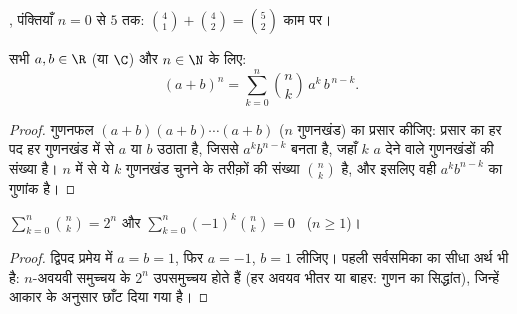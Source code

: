 \begin{omfigure}

{\small {}, पंक्तियाँ $n = 0$ से $5$ तक:  $\binom{4}{1} + \binom{4}{2} = \binom{5}{2}$ काम
पर।}
\end{omfigure}

\begin{theorem}[द्विपद प्रमेय]\label{thm:g12:comb:binomial}
सभी $a, b \in \R$ (या $\C$) और $n \in \N$ के लिए:
\[
(a+b)^n = \sum_{k=0}^{n} \binom{n}{k}\, a^{k}\, b^{\,n-k} .
\]
\end{theorem}

\begin{proof}
गुणनफल $(a+b)(a+b)\cdots(a+b)$ ($n$ गुणनखंड) का प्रसार कीजिए: प्रसार का हर पद हर गुणनखंड में
से $a$ या $b$ उठाता है, जिससे $a^k b^{n-k}$ बनता है, जहाँ $k$ $a$ देने वाले
गुणनखंडों की संख्या है। $n$ में से ये $k$ गुणनखंड चुनने के तरीक़ों की
संख्या $\binom nk$ है, और इसलिए वही $a^k b^{n-k}$ का गुणांक है।
\end{proof}

\begin{corollary}\label{cor:g12:comb:sums}
$\displaystyle\sum_{k=0}^{n} \binom{n}{k} = 2^n$
\quad और \quad
$\displaystyle\sum_{k=0}^{n} (-1)^k\binom{n}{k} = 0$ \ ($n \geq 1$)।
\end{corollary}

\begin{proof}
द्विपद प्रमेय में $a = b = 1$, फिर $a = -1$, $b = 1$ लीजिए। पहली सर्वसमिका का सीधा अर्थ
भी है: $n$-अवयवी समुच्चय के $2^n$ उपसमुच्चय होते हैं (हर अवयव भीतर या
बाहर: गुणन का सिद्धांत), जिन्हें आकार के अनुसार छाँट दिया गया है।
\end{proof}


